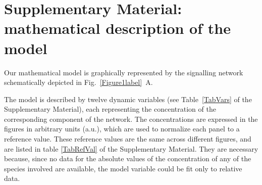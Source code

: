 \documentclass[oneside, 10pt, a4paper, twocolumn]{article}
\begin{document}
\section{Supplementary Material: mathematical description of the model}
\label{Tables}

Our mathematical model is graphically represented by 
the signalling network schematically depicted in Fig.~\ref{Figure1label}~A. %

The model is described by twelve dynamic variables (see Table~\ref{TabVars} of the Supplementary Material), 
each representing the concentration of the corresponding component of the network. 
The concentrations are expressed in the figures in arbitrary units (a.u.), which are used to normalize each panel to a reference value. These reference values are the same across different figures, and are listed in table \ref{TabRefVal} of the Supplementary Material. They are necessary because, since no data for the absolute values of the concentration of any of the species involved are available, the model variable could be fit only to relative data.
\end{document}
